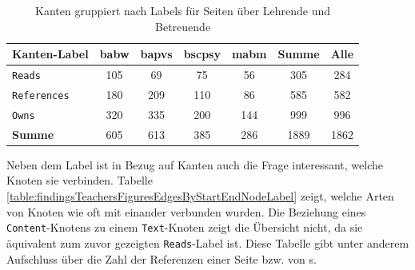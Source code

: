     \begin{table}[htb]
        \centering
        \begin{tabular}{|l|c|c|c|c|c|c|}
            \hline
            \multicolumn{1}{|c|}{\textbf{Kanten-Label}} & \textbf{\gls{babw}} & \textbf{\gls{bapvs}} & \textbf{\gls{bscpsy}} & \textbf{\gls{mabm}} & \textbf{Summe} & \textbf{Alle} \\ \hline
            \texttt{Reads}                                       & 105           & 69             & 75              & 56            & 305            & 284           \\ \hline
            \texttt{References}                                  & 180           & 209            & 110             & 86            & 585            & 582           \\ \hline
            \texttt{Owns}                                        & 320           & 335            & 200             & 144           & 999            & 996           \\ \hline
            \hline
            \textbf{Summe}                              & 605           & 613            & 385             & 286           & 1889           & 1862          \\ \hline
        \end{tabular}
        \caption{Kanten gruppiert nach Labels für Seiten über Lehrende und Betreuende}
        \label{table:findingTeachersFiguresEdgesByLabel}
    \end{table}

    Neben dem Label ist in Bezug auf Kanten auch die Frage interessant,
    welche Knoten sie verbinden.
    Tabelle \ref{table:findingsTeachersFiguresEdgesByStartEndNodeLabel}
    zeigt, welche Arten von Knoten wie oft mit einander verbunden wurden.
    Die Beziehung eines \texttt{Content}-Knotens zu einem \texttt{Text}-Knoten
    zeigt die Übersicht nicht,
    da sie äquivalent zum zuvor gezeigten \texttt{Reads}-Label ist.
    Diese Tabelle gibt unter anderem Aufschluss über die Zahl der Referenzen
    einer Seite bzw. von {\contentFeature}s.

